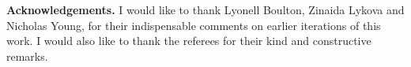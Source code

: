 \documentclass[10pt, reqno]{amsart}
\theoremstyle{definition}
\numberwithin{equation}{section}
\begin{document}
    
    








{\bf Acknowledgements.} I would like to thank Lyonell Boulton, Zinaida Lykova and Nicholas Young, for their indispensable comments on earlier iterations of this work. I would also like to thank the referees for their kind and constructive remarks.
\end{document}
